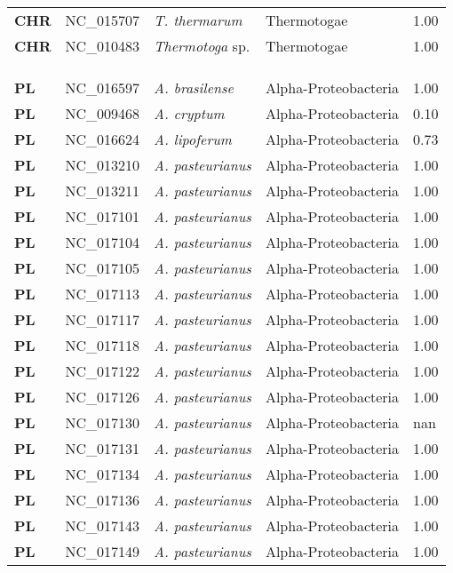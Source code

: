 \begin{adjustwidth}{-3cm}{2cm}
{\begin{supertabular}{>{\bfseries}l|p{0.1\textwidth}p{0.14\textwidth}l|l}
CHR & NC\_015707 & \textit{T. thermarum} & Thermotogae & 1.00\\
CHR & NC\_010483 & \textit{Thermotoga} sp. & Thermotogae & 1.00\\
\\
\\
\hline\\
PL & NC\_016597 & \textit{A. brasilense} & Alpha-Proteobacteria & 1.00\\
PL & NC\_009468 & \textit{A. cryptum} & Alpha-Proteobacteria & 0.10\\
PL & NC\_016624 & \textit{A. lipoferum} & Alpha-Proteobacteria & 0.73\\
PL & NC\_013210 & \textit{A. pasteurianus} & Alpha-Proteobacteria & 1.00\\
PL & NC\_013211 & \textit{A. pasteurianus} & Alpha-Proteobacteria & 1.00\\
PL & NC\_017101 & \textit{A. pasteurianus} & Alpha-Proteobacteria & 1.00\\
PL & NC\_017104 & \textit{A. pasteurianus} & Alpha-Proteobacteria & 1.00\\
PL & NC\_017105 & \textit{A. pasteurianus} & Alpha-Proteobacteria & 1.00\\
PL & NC\_017113 & \textit{A. pasteurianus} & Alpha-Proteobacteria & 1.00\\
PL & NC\_017117 & \textit{A. pasteurianus} & Alpha-Proteobacteria & 1.00\\
PL & NC\_017118 & \textit{A. pasteurianus} & Alpha-Proteobacteria & 1.00\\
PL & NC\_017122 & \textit{A. pasteurianus} & Alpha-Proteobacteria & 1.00\\
PL & NC\_017126 & \textit{A. pasteurianus} & Alpha-Proteobacteria & 1.00\\
PL & NC\_017130 & \textit{A. pasteurianus} & Alpha-Proteobacteria & nan\\
PL & NC\_017131 & \textit{A. pasteurianus} & Alpha-Proteobacteria & 1.00\\
PL & NC\_017134 & \textit{A. pasteurianus} & Alpha-Proteobacteria & 1.00\\
PL & NC\_017136 & \textit{A. pasteurianus} & Alpha-Proteobacteria & 1.00\\
PL & NC\_017143 & \textit{A. pasteurianus} & Alpha-Proteobacteria & 1.00\\
PL & NC\_017149 & \textit{A. pasteurianus} & Alpha-Proteobacteria & 1.00\\

\end{supertabular}}
\end{adjustwidth}
